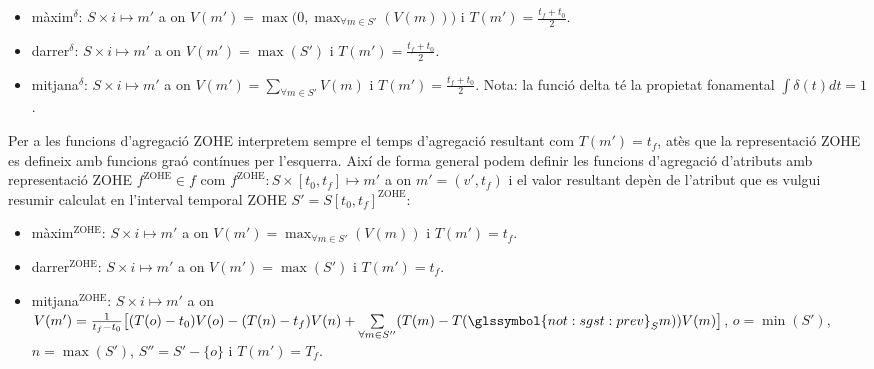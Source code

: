 \begin{itemize}
\item màxim$^\delta$: $S \times i \mapsto m'$ a on $V(m') =
  \max\big(0,\max_{\forall m \in S'}(V(m))\big)$ i
  $T(m')=\frac{t_f+t_0}{2}$.

\item darrer$^\delta$: $S \times i \mapsto m'$ a on $V(m') =
  \max(S')$ i $T(m')=\frac{t_f+t_0}{2}$.

\item mitjana$^\delta$: $S \times i \mapsto m'$ a on $V(m') =
  \sum\limits_{\forall m \in S'} V(m)$ i
  $T(m')=\frac{t_f+t_0}{2}$. Nota: la funció delta té la propietat
  fonamental $\int \delta(t)dt = 1$.
\end{itemize}



Per a les funcions d'agregació ZOHE interpretem sempre el temps
d'agregació resultant com $T(m')=t_f$, atès que la representació ZOHE
es defineix amb funcions graó contínues per l'esquerra. Així de forma
general podem definir les funcions d'agregació d'atributs amb
representació ZOHE $f^{\text{ZOHE}}\in f$ com $f^{\text{ZOHE}}: S
\times [t_0,t_f] \mapsto m'$ a on $m'=(v',t_f)$ i el valor resultant
depèn de l'atribut que es vulgui resumir calculat en l'interval
temporal ZOHE $S'=S[t_0,t_f]^\text{ZOHE}$:
\begin{itemize}
\item màxim$^\text{ZOHE}$: $S \times i \mapsto m'$ a on $V(m') = \max_{\forall m
    \in S'}(V(m))$ i $T(m')=t_f$.

\item darrer$^\text{ZOHE}$: $S \times i \mapsto m'$ a on $V(m') =
  \max(S')$ i $T(m')=t_f$.

\item mitjana$^\text{ZOHE}$: $S \times i \mapsto m'$ a on $V(m') =
  \frac{1}{t_f-t_0} \big[ (T(o)-t_0)V(o) -( T(n)-t_f)V(n) +
  \sum\limits_{\forall m \in S''}( T(m)- T(\glssymbol{not:sgst:prev}_S
  m) )V(m) \big]$, $o=\min(S')$, $n=\max(S')$, $S''= S' - \{o\}$ i
  $T(m')=T_f$. 
\end{itemize}

